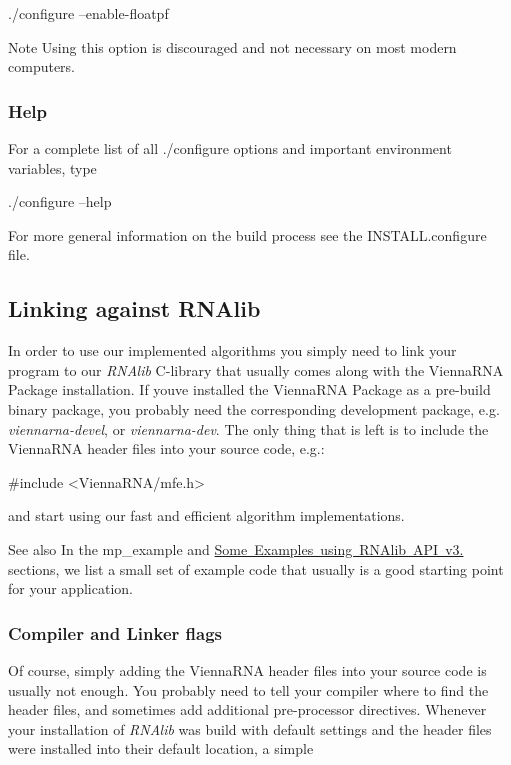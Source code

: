 \begin{DoxyVerb}./configure --enable-floatpf
\end{DoxyVerb}


\begin{DoxyNote}{Note}
Using this option is discouraged and not necessary on most modern computers.
\end{DoxyNote}
\hypertarget{install_config_help}{}\subsubsection{Help}\label{install_config_help}
For a complete list of all ./configure options and important environment variables, type

\begin{DoxyVerb}./configure --help
\end{DoxyVerb}


For more general information on the build process see the I\+N\+S\+T\+A\+L\+L.\+configure file.\hypertarget{install_linking}{}\subsection{Linking against R\+N\+Alib}\label{install_linking}
In order to use our implemented algorithms you simply need to link your program to our {\itshape R\+N\+Alib} C-\/library that usually comes along with the Vienna\+R\+NA Package installation. If you\textquotesingle{}ve installed the Vienna\+R\+NA Package as a pre-\/build binary package, you probably need the corresponding development package, e.\+g. {\itshape viennarna-\/devel}, or {\itshape viennarna-\/dev}. The only thing that is left is to include the Vienna\+R\+NA header files into your source code, e.\+g.\+:

\begin{DoxyVerb}#include <ViennaRNA/mfe.h>
\end{DoxyVerb}


and start using our fast and efficient algorithm implementations.

\begin{DoxySeeAlso}{See also}
In the mp\+\_\+example and \mbox{\hyperlink{new_a_p_i_newAPI_examples}{Some Examples using R\+N\+Alib A\+PI v3.}} sections, we list a small set of example code that usually is a good starting point for your application.
\end{DoxySeeAlso}
\hypertarget{install_linking_flags}{}\subsubsection{Compiler and Linker flags}\label{install_linking_flags}
Of course, simply adding the Vienna\+R\+NA header files into your source code is usually not enough. You probably need to tell your compiler where to find the header files, and sometimes add additional pre-\/processor directives. Whenever your installation of {\itshape R\+N\+Alib} was build with default settings and the header files were installed into their default location, a simple

